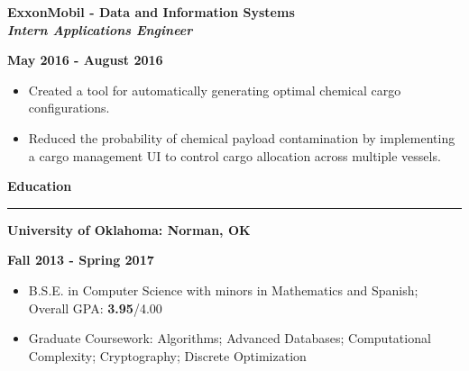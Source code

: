 \documentclass[10pt,letterpaper]{article}
\begin{document}
\begin{minipage}[t]{0.53\textwidth}
    \begin{flushleft}
        \textbf{ExxonMobil - Data and Information Systems}\\
        \textbf{\textit{Intern Applications Engineer}}\\
    \end{flushleft}
\end{minipage}
\begin{minipage}[t]{0.44\textwidth}
    \begin{flushright}
        \textbf{May 2016 - August 2016}
    \end{flushright}
\end{minipage}

\begin{itemize}[noitemsep,topsep=0pt]
    \setlength\itemsep{0.2em}
    \item Created a tool for automatically generating optimal chemical cargo
          configurations.
    \item Reduced the probability of chemical payload contamination by
          implementing a cargo management UI to control cargo allocation
          across multiple vessels.

\end{itemize}

\medskip

\begin{large}
    \textbf{Education}
\end{large}

\smallskip \hrule \smallskip

\begin{minipage}[t]{0.5\textwidth}
    \begin{flushleft}
        \textbf{University of Oklahoma: Norman, OK}\\

    \end{flushleft}
\end{minipage}
\begin{minipage}[t]{0.47\textwidth}
    \begin{flushright}
        \textbf{Fall 2013 - Spring 2017}

    \end{flushright}
\end{minipage}
\begin{itemize}[topsep=0pt]
    \setlength\itemsep{0.2em}
    \item B.S.E. in Computer Science with minors in Mathematics and Spanish;
          Overall GPA: \textbf{3.95}/{4.00}
    \item Graduate Coursework: Algorithms;
                               Advanced Databases;
                               Computational Complexity;
                               Cryptography;
                               Discrete Optimization
\end{itemize}
\end{document}
